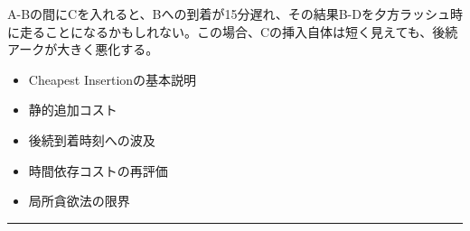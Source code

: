 A-Bの間にCを入れると、Bへの到着が15分遅れ、その結果B-Dを夕方ラッシュ時に走ることになるかもしれない。この場合、Cの挿入自体は短く見えても、後続アークが大きく悪化する。\par
{}
\begin{itemize}
\item Cheapest Insertionの基本説明
\item 静的追加コスト
\item 後続到着時刻への波及
\item 時間依存コストの再評価
\item 局所貪欲法の限界
\end{itemize}
\vspace{2mm}\hrule\vspace{2mm}

